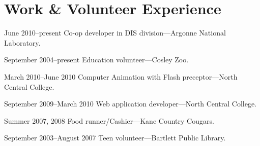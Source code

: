 \documentclass{simplecv}
\begin{document}
  \section{Work \& Volunteer Experience}
  \begin{topic}
    \item[June 2010--present] Co-op developer in DIS division---Argonne National Laboratory.
    \item[September 2004--present] Education volunteer---Cosley Zoo.
    \item[March 2010--June 2010] Computer Animation with Flash preceptor---North Central College.
    \item[September 2009--March 2010] Web application developer---North Central College.
    \item[Summer 2007, 2008] Food runner/Cashier---Kane Country Cougars.
    \item[September 2003--August 2007] Teen volunteer---Bartlett Public Library.
  \end{topic}
\end{document}
